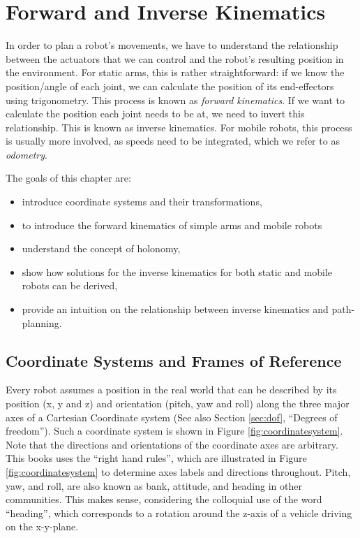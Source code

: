 \chapter{Forward and Inverse Kinematics}\label{chap:kinematics}
In order to plan a robot's movements, we have to understand the relationship between the actuators that we can control and the robot's resulting position in the environment. For static arms, this is rather straightforward: if we know the position/angle of each joint, we can calculate the position of its end-effectors using trigonometry. This process is known as \emph{forward kinematics}.  If we want to calculate the position each joint needs to be at, we need to invert this relationship. This is known as inverse kinematics.  For mobile robots, this process is usually more involved, as speeds need to be integrated, which we refer to as \emph{odometry}.

The goals of this chapter are:

\begin{itemize}
\item introduce coordinate systems and their transformations,
\item to introduce the forward kinematics of simple arms and mobile robots
\item understand the concept of holonomy,
\item show how solutions for the inverse kinematics for both static and mobile robots can be derived,
\item provide an intuition on the relationship between inverse kinematics and path-planning.
\end{itemize}

\section{Coordinate Systems and Frames of Reference}\label{sec:coordsystems}
Every robot assumes a position in the real world that can be described by its position (x, y and z) and orientation (pitch, yaw and roll) along the three major axes of a Cartesian Coordinate system (See also Section \ref{sec:dof}, ``Degrees of freedom''). Such a coordinate system is shown in Figure \ref{fig:coordinatesystem}. Note that the directions and orientations of the coordinate axes are arbitrary. This books uses the ``right hand rules'', which are illustrated in Figure \ref{fig:coordinatesystem} to determine axes labels and directions throughout. Pitch, yaw, and roll, are also known as bank, attitude, and heading in other communities.  This makes sense, considering the colloquial use of the word ``heading'', which corresponds to a rotation around the z-axis of a vehicle driving on the x-y-plane. 

